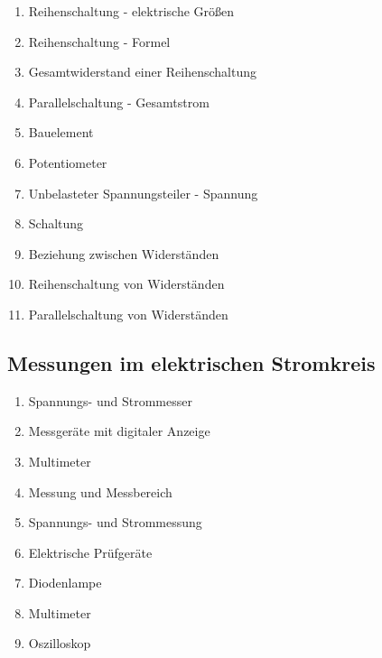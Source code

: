 \begin{enumerate}
\item
  Reihenschaltung - elektrische Größen\\
\item
  Reihenschaltung - Formel\\
\item
  Gesamtwiderstand einer Reihenschaltung\\
\item
  Parallelschaltung - Gesamtstrom\\
\item
  Bauelement\\
\item
  Potentiometer\\
\item
  Unbelasteter Spannungsteiler - Spannung\\
\item
  Schaltung\\
\item
  Beziehung zwischen Widerständen\\
\item
  Reihenschaltung von Widerständen\\
\item
  Parallelschaltung von Widerständen
\end{enumerate}

\subsection{Messungen im elektrischen
Stromkreis}\label{messungen-im-elektrischen-stromkreis}

\begin{enumerate}
\item
  Spannungs- und Strommesser\\
\item
  Messgeräte mit digitaler Anzeige\\
\item
  Multimeter\\
\item
  Messung und Messbereich\\
\item
  Spannungs- und Strommessung\\
\item
  Elektrische Prüfgeräte\\
\item
  Diodenlampe\\
\item
  Multimeter\\
\item
  Oszilloskop
\end{enumerate}

